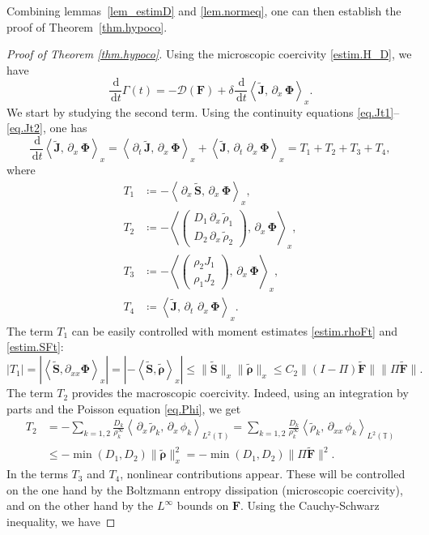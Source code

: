 \documentclass[reqno]{amsart}
\newcommand{\dt}{\,\partial_t\, }
\newcommand{\dx}{\,\partial_x\, }
\newcommand{\dxx}{\,\partial_{xx}\, }
\newcommand{\dd}{\,\mathrm{d}}
\newcommand{\T}{\mathbb{T}}
\newcommand{\Ft}{{\widetilde{F}}}
\newcommand{\rhot}{\widetilde{\rho}}
\newcommand{\Jt}{\widetilde{J}}
\newcommand{\St}{\widetilde{S}}
\newcommand{\Ftbf}{\mathbf{\Ft}}
\newcommand{\Fbf}{\mathbf{F}}
\newcommand{\Phibf}{\boldsymbol{\Phi}}
\newcommand{\rhotbf}{\boldsymbol{\rhot}}
\newcommand{\Jtbf}{\mathbf{\Jt}}
\newcommand{\Stbf}{\mathbf{\St}}
\newcommand{\lla}{\left\langle}
\newcommand{\rra}{\right\rangle}
\numberwithin{equation}{section}
\begin{document}
Combining lemmas~\ref{lem_estimD} and \ref{lem.normeq}, one can then establish the proof of Theorem~\ref{thm.hypoco}.

\begin{proof}[Proof of Theorem \ref{thm.hypoco}]
    Using the microscopic coercivity \eqref{estim.H_D}, we have
    \[ \frac{\dd}{\dd t}\Gamma(t)=-\mathcal{D}(\Fbf)+\delta\frac{\dd}{\dd t}\lla \Jtbf,\dx\Phibf\rra_x. \]
    We start by studying the second term. Using the continuity equations \eqref{eq.Jt1}--\eqref{eq.Jt2}, one has
    \[\frac{\dd}{\dd t}\lla \Jtbf,\dx\Phibf\rra_x=\lla\dt \Jtbf,\dx\Phibf\rra_x+\lla \Jtbf,\dt\dx\Phibf\rra_x= T_1+T_2+T_3+T_4,\]
    where
    \begin{align*}
        T_1 &\coloneq  -\lla\dx \Stbf,\dx\Phibf\rra_x,\\
        T_2 &\coloneq  -\lla\left(\begin{matrix}D_1\dx\rhot_1 \\ D_2\dx\rhot_2\end{matrix}\right),\dx\Phibf\rra_x,\\
        T_3 &\coloneq  -\lla\left(\begin{matrix} \rho_2 J_1\\ \rho_1 J_2\end{matrix}\right),\dx\Phibf\rra_x,\\
        T_4 &\coloneq \lla \Jtbf,\dt\dx\Phibf\rra_x.
    \end{align*}
    The term $T_1$ can be easily controlled with moment estimates \eqref{estim.rhoFt} and \eqref{estim.SFt}:   
    \begin{equation*}
        |T_1|=\left|\lla \Stbf,\partial_{xx}\Phibf\rra_x\right|=\left|-\lla \Stbf,\rhotbf\rra_x\right|\leq \|\Stbf\|_x\|\rhotbf\|_x\leq C_2\|(I-\Pi)\Ftbf\|\|\Pi \Ftbf\|.
    \end{equation*}
    The term $T_2$ provides the macroscopic coercivity. Indeed, using an integration by parts and the Poisson equation \eqref{eq.Phi}, we get
    \begin{align*}
        T_2&=-\sum_{k=1,2}\frac{D_k}{\rho_k^\infty}\lla\dx\rhot_k,\dx\phi_k\rra_{L^2(\T)}=\sum_{k=1,2}\frac{D_k}{\rho_k^\infty}\lla \rhot_k,\dxx\phi_k\rra_{L^2(\T)}\\
        &\leq -\min(D_1,D_2)\|\rhotbf\|_x^2 = -\min(D_1,D_2)\|\Pi\Ftbf\|^2.
    \end{align*}
    In the terms $T_3$ and $T_4$, nonlinear contributions appear. These will be controlled on the one hand by the Boltzmann entropy dissipation (microscopic coercivity), and on the other hand by the $L^\infty$ bounds on $\Fbf$. Using the Cauchy-Schwarz inequality, we have

\end{proof}
\end{document}
